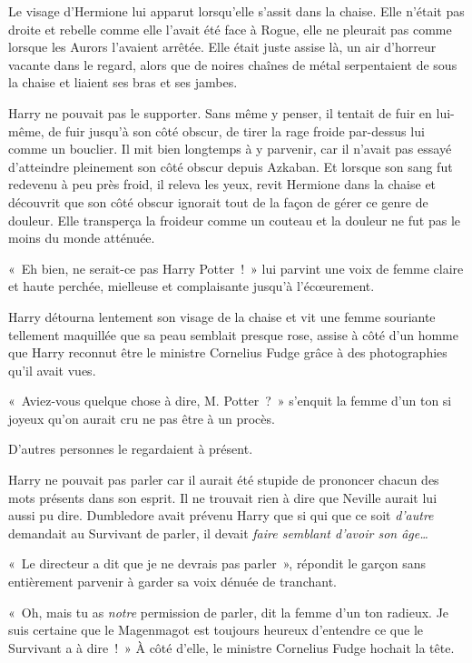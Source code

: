 Le visage d'Hermione lui apparut lorsqu'elle s'assit dans la chaise. Elle n'était pas droite et rebelle comme elle l'avait été face à Rogue, elle ne pleurait pas comme lorsque les Aurors l'avaient arrêtée. Elle était juste assise là, un air d'horreur vacante dans le regard, alors que de noires chaînes de métal serpentaient de sous la chaise et liaient ses bras et ses jambes.

Harry ne pouvait pas le supporter. Sans même y penser, il tentait de fuir en lui-même, de fuir jusqu'à son côté obscur, de tirer la rage froide par-dessus lui comme un bouclier. Il mit bien longtemps à y parvenir, car il n'avait pas essayé d'atteindre pleinement son côté obscur depuis Azkaban. Et lorsque son sang fut redevenu à peu près froid, il releva les yeux, revit Hermione dans la chaise et découvrit que son côté obscur ignorait tout de la façon de gérer ce genre de douleur. Elle transperça la froideur comme un couteau et la douleur ne fut pas le moins du monde atténuée.

«~Eh bien, ne serait-ce pas Harry Potter~!~» lui parvint une voix de femme claire et haute perchée, mielleuse et complaisante jusqu'à l'écœurement.

Harry détourna lentement son visage de la chaise et vit une femme souriante tellement maquillée que sa peau semblait presque rose, assise à côté d'un homme que Harry reconnut être le ministre Cornelius Fudge grâce à des photographies qu'il avait vues.

«~Aviez-vous quelque chose à dire, M. Potter~?~» s'enquit la femme d'un ton si joyeux qu'on aurait cru ne pas être à un procès.

D'autres personnes le regardaient à présent.

Harry ne pouvait pas parler car il aurait été stupide de prononcer chacun des mots présents dans son esprit. Il ne trouvait rien à dire que Neville aurait lui aussi pu dire. Dumbledore avait prévenu Harry que si qui que ce soit \emph{d'autre} demandait au Survivant de parler, il devait \emph{faire semblant d'avoir son âge…}

«~Le directeur a dit que je ne devrais pas parler~», répondit le garçon sans entièrement parvenir à garder sa voix dénuée de tranchant.

«~Oh, mais tu as \emph{notre} permission de parler, dit la femme d'un ton radieux. Je suis certaine que le Magenmagot est toujours heureux d'entendre ce que le Survivant a à dire~!~» À côté d'elle, le ministre Cornelius Fudge hochait la tête.

